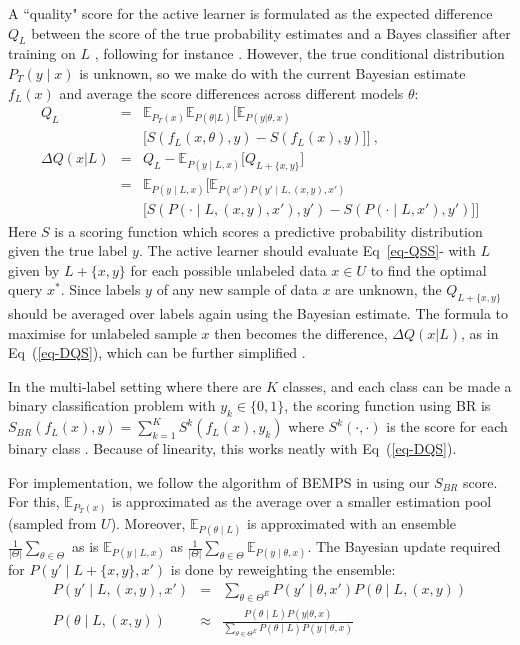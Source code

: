 \documentclass[letterpaper]{article} %
\begin{document}
A ``quality"  score for the active learner is formulated
as the expected difference $Q_L$
between the score of the true probability estimates and a Bayes classifier after training on $L$ \citep{TanDuBun-IEEEPAMI23}, following for instance \citet[Sct.~4.1]{pmlr-v20-hung11}.
However, the  true conditional distribution $P_T(y\mid x)$ is unknown, so we make do with the current Bayesian estimate $f_L(x)$ and average the score differences across different models $\theta$:
{\scriptsize
\begin{eqnarray}
Q_L
&=&  \mathbb{E}_{P_T(x)}
\mathbb{E}_{P(\theta|L)}  \Big[
\mathbb{E}_{P(y|\theta,x)}  \nonumber\\
&& \big[
S(f_L(x,\theta),y) - S(f_L(x),y)
\big] \Big] ~, \label{eq-QSS}\\
\Delta{Q}(x|L)
&=& Q_{L} - \mathbb{E}_{ P(y \mid L,x) }\big[ Q_{L+\{x,y\}}   \big]
\nonumber\\%
&=&\mathbb{E}_{P(y\mid L, x)}
\bigg[
\mathbb{E}_{P(x') P (y' \mid L, (x, y), x')}
\nonumber\\
&&
\big[
S(P(\cdot \mid L, (x, y), x'), y')
- S(P(\cdot \mid L, x'), y')
\big]
\bigg] \label{eq-DQS}
\end{eqnarray}}
\noindent
Here $S$ is a scoring function which
scores a predictive probability distribution given the true label $y$. The active learner should evaluate Eq~\eqref{eq-QSS}- with $L$ given by ${L+ \{x,y\}}$ for each possible unlabeled data $x \in U$ to find the optimal query  $x^*$.
Since labels $y$ of any new sample of data $x$ are unknown,
the $Q_{L+ \{x,y\}}$ should be averaged over labels again using the Bayesian estimate.  The formula to maximise for unlabeled sample $x$ then becomes the difference,
$\Delta{Q}(x|L)$, as in Eq~(\ref{eq-DQS}),
which can be further simplified \cite[Equation 6]{TanDuBun-IEEEPAMI23}.

In the multi-label setting where there are $K$ classes, and each class can be made a binary classification problem with $y_{k} \in \{0,1 \}$, the scoring function using BR is
$S_{BR}( f_L(x),y) =\sum_{k=1}^{K}S^k(f_L(x),y_k)$
where $S^k(\cdot,\cdot)$ is the score for each binary class \cite{dawid2014theory}.  Because of linearity, this works neatly with Eq~(\ref{eq-DQS}).



For implementation, we follow the algorithm of BEMPS in  \cite{TanDuBun-IEEEPAMI23} using our $S_{BR}$ score.
For this,
$\mathbb{E}_{P_T(x)}$ is approximated as the average over a smaller estimation pool (sampled from $U$). Moreover, $\mathbb{E}_{ P(\theta \mid L) }$ is approximated with an ensemble $\frac{1}{|\Theta|}\sum_{\theta\in\Theta} $
as is
$\mathbb{E}_{ P(y \mid L,x) }$ as
$\frac{1}{|\Theta|}\sum_{\theta\in\Theta} \mathbb{E}_{ P(y \mid \theta,x) }$.  The Bayesian update required for $P(y' \mid L+\{x,y\},x')$ is done by reweighting the ensemble:
{\scriptsize
\begin{eqnarray}
P(y' \mid L, (x, y), x') &=& \sum_{\theta\in\Theta^E} P(y' \mid \theta, x') P(\theta \mid L, (x, y))
\label{eq-3}\\
P(\theta \mid L, (x, y)) & \approx&
\frac{P(\theta \mid L) P(y|\theta,x)}
{\sum_{\theta\in\Theta^E} P(\theta\mid L) P(y \mid \theta,x)} \label{eq-4}
\end{eqnarray} }
\end{document}
